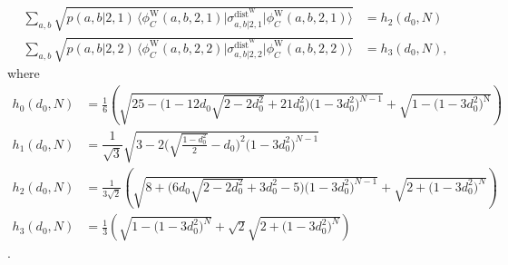 \documentclass[reprint,superscriptaddress,nofootinbib,amsmath,amssymb,aps,pra,longbibliography]{revtex4-1}
\begin{document}
\begin{widetext}
\begin{align}
	\sum_{a,b} \sqrt{p(a,b|2,1) \, \Big\langle \phi_{C}^{\text{W}} (a,b, 2,1) \Big| \sigma_{a,b|2,1}^{\text{dist}^{\text{W}}} \Big| \phi_{C}^{\text{W}} (a,b, 2,1) \Big\rangle} 
	&= h_2(d_0,N) \label{www8} \\
	\sum_{a,b} \sqrt{p(a,b|2,2) \, \Big\langle \phi_{C}^{\text{W}} (a,b, 2,2) \Big| \sigma_{a,b|2,2}^{\text{dist}^{\text{W}}} \Big| \phi_{C}^{\text{W}} (a,b, 2,2) \Big\rangle} &= h_3(d_0,N),
	\label{www9}
\end{align}
where
\begin{align}
   h_0(d_0, N) &= \frac{1}{6} \left(\sqrt{25 - \Big(1 - 12 d_0 \sqrt{2 - 2 d_0^2} + 21 d_0^2 \Big) \Big(1 - 3 d_0^2 \Big)^{N-1}}+\sqrt{1- \Big(1-3d_0^2 \Big)^{\text{N}}}\right) \nonumber \\
   h_1(d_0, N) &= \dfrac{1}{\sqrt{3}}\sqrt{3 - 2 \Bigg(\sqrt{\frac{1-d_0^2}{2}} - d_0 \Bigg)^2 \Big(1-3d_0^2 \Big)^{N-1}} \nonumber \\
 h_2(d_0, N) &= \frac{1}{3 \sqrt{2}} \left( \sqrt{8 + \Big( 6 d_0  \sqrt{2 - 2 d_0^2} + 3 d_0^2 -5  \Big) \Big(1-3d_0^2 \Big)^{N-1} }+\sqrt{2+\Big(1-3d_0^2 \Big)^{N}} \right) \nonumber \\
h_3(d_0, N) &= \frac{1}{3} \left(\sqrt{1-\Big(1-3d_0^2 \Big)^{N} }+\sqrt{2} \sqrt{2+ \Big(1-3d_0^2 \Big)^{N}}\right)
\label{expressionw2}
\end{align}.


\end{widetext}
\end{document}
